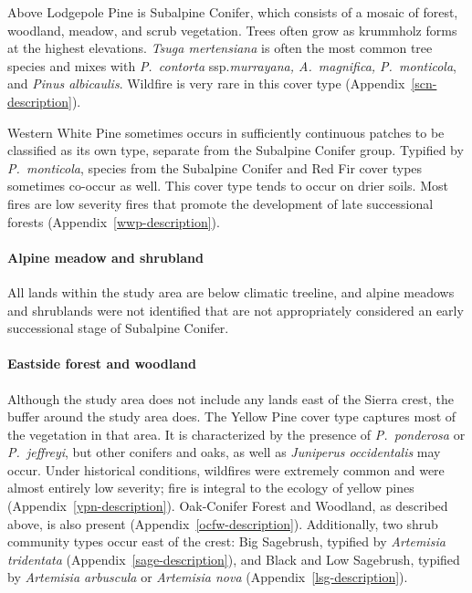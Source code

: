 Above Lodgepole Pine is Subalpine Conifer, which consists of a mosaic of forest, woodland, meadow, and scrub vegetation. Trees often grow as krummholz forms at the highest elevations. \emph{Tsuga mertensiana} is often the most common tree species and mixes with \emph{P.~contorta} ssp.\@ \emph{murrayana, A.~magnifica, P.~monticola}, and \emph{Pinus albicaulis}. Wildfire is very rare in this cover type (Appendix~\ref{scn-description}). 

Western White Pine sometimes occurs in sufficiently continuous patches to be classified as its own type, separate from the Subalpine Conifer group. Typified by \emph{P.~monticola}, species from the Subalpine Conifer and Red Fir cover types sometimes co-occur as well. This cover type tends to occur on drier soils. Most fires are low severity fires that promote the development of late successional forests (Appendix~\ref{wwp-description}).


\paragraph*{Alpine meadow and shrubland} All lands within the study area are below climatic treeline, and alpine meadows and shrublands were not identified that are not appropriately considered an early successional stage of Subalpine Conifer.


\paragraph*{Eastside forest and woodland} Although the study area does not include any lands east of the Sierra crest, the buffer around the study area does. The Yellow Pine cover type captures most of the vegetation in that area. It is characterized by the presence of \emph{P.~ponderosa} or \emph{P.~jeffreyi}, but other conifers and oaks, as well as \emph{Juniperus occidentalis} may occur. Under historical conditions, wildfires were extremely common and were almost entirely low severity; fire is integral to the ecology of yellow pines (Appendix~\ref{ypn-description}). 
%
Oak-Conifer Forest and Woodland, as described above, is also present (Appendix~\ref{ocfw-description}). 
%
Additionally, two shrub community types occur east of the crest: Big Sagebrush, typified by \emph{Artemisia tridentata} (Appendix~\ref{sage-description}), and Black and Low Sagebrush, typified by \emph{Artemisia arbuscula} or \emph{Artemisia nova} (Appendix~\ref{lsg-description}). 


